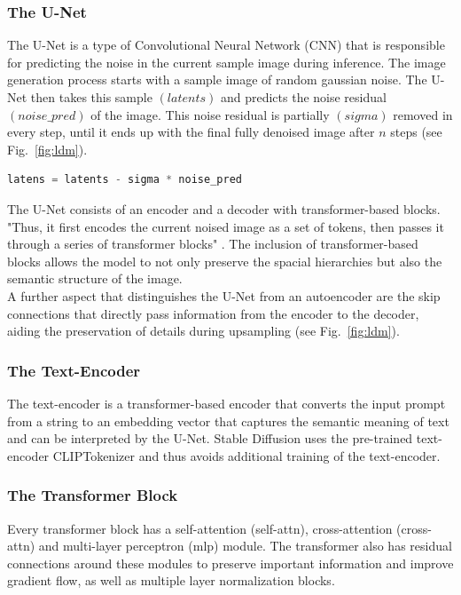 \subsubsection{The U-Net}
The U-Net \cite{ronneberger2015u} is a type of Convolutional Neural Network (CNN) that is responsible for predicting the noise in the current sample image during inference. The image generation process starts with a sample image of random gaussian noise. The U-Net then takes this sample \((latents)\) and predicts the noise residual \((noise\_pred)\) of the image. 
This noise residual is partially \((sigma)\) removed in every step, until it ends up with the final fully denoised image after \(n\) steps (see Fig.~\ref{fig:ldm}).
\begin{lstlisting}[language=Python]
latens = latents - sigma * noise_pred
\end{lstlisting}
The U-Net consists of an encoder and a decoder with transformer-based blocks. "Thus, it first encodes the current noised image as a set of tokens, then passes it through a series of transformer blocks" \cite{bolya2023tomesd}. The inclusion of transformer-based blocks allows the model to not only preserve the spacial hierarchies but also the semantic structure of the image.\\
A further aspect that distinguishes the U-Net from an autoencoder are the skip connections that directly pass information from the encoder to the decoder, aiding the preservation of details during upsampling (see Fig.~\ref{fig:ldm}).



\subsubsection{The Text-Encoder}
The text-encoder is a transformer-based encoder that converts the input prompt from a string to an embedding vector that captures the semantic meaning of text and can be interpreted by the U-Net. Stable Diffusion uses the pre-trained text-encoder CLIPTokenizer \cite{radford2021learning} and thus avoids additional training of the text-encoder.



\subsubsection{The Transformer Block}
Every transformer block has a self-attention (self-attn), cross-attention (cross-attn) and multi-layer perceptron (mlp) module.
The transformer also has residual connections around these modules to preserve important information and improve gradient flow, as well as multiple layer normalization blocks.



